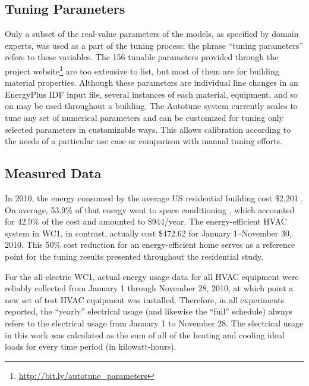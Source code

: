 \documentclass[preprint, review, 12pt]{elsarticle}
\begin{document}
\subsection{Tuning Parameters}
Only a subset of the real-value parameters of the models, as specified by domain experts, was used as a part of the tuning process; the phrase ``tuning parameters'' refers to these variables. The 156 tunable parameters provided through the project website\footnote{\url{http://bit.ly/autotune_parameters}} are too extensive to list, but most of them are for building material properties. Although these parameters are individual line changes in an EnergyPlus IDF input file, several instances of each material, equipment, and so on may be used throughout a building. The Autotune system currently scales to tune any set of numerical parameters and can be customized for tuning only selected parameters in customizable ways. This allows calibration according to the needs of a particular use case or comparison with manual tuning efforts.

\subsection{Measured Data}
In 2010, the energy consumed by the average US residential building cost \$2,201 \cite{cit:doe2012a}. On average, 53.9\% of that energy went to space conditioning \cite{cit:doe2012b}, which accounted for 42.9\% of the cost and amounted to \$944/year. The energy-efficient HVAC system in WC1, in contrast, actually cost \$472.62 for January 1--November 30, 2010. This 50\% cost reduction for an energy-efficient home serves as a reference point for the tuning results presented throughout the residential study.

For the all-electric WC1, actual energy usage data for all HVAC equipment were reliably collected from January 1 through November 28, 2010, at which point a new set of test HVAC equipment was installed. Therefore, in all experiments reported, the ``yearly'' electrical usage (and likewise the ``full'' schedule) always refers to the electrical usage from January 1 to November 28. The electrical usage in this work was calculated as the sum of all of the heating and cooling ideal loads for every time period (in kilowatt-hours).
\end{document}
